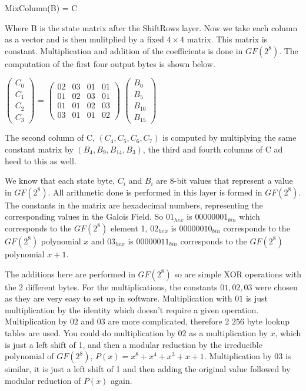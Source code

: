 \begin{center}
MixColumn(B) = C
\end{center}

Where B is the state matrix after the ShiftRows layer. Now we take each column as a vector and is then mulitplied by a fixed $4 \times 4$ matrix. This matrix is constant. Multiplication and addition of the coefficients is done in $GF(2^8)$. The computation of the first four output bytes is shown below.
\begin{center}
$
\begin{pmatrix}
C_0 \\
C_1 \\
C_2 \\
C_3
\end{pmatrix} 
$
=
$
\begin{pmatrix}
02 & 03 & 01 & 01 \\
01 & 02 & 03 & 01 \\
01 & 01 & 02 & 03 \\
03 & 01 & 01 & 02
\end{pmatrix}
$
$
\begin{pmatrix}
B_0 \\
B_5 \\
B_{10} \\
B_{15} 
\end{pmatrix}
$
\end{center}

The second column of C, $(C_4, C_5, C_6, C_7)$ is computed by multiplying the same constant matrix by $(B_4, B_9, B_{14}, B_3)$, the third and fourth columns of C ad heed to this as well. 

We know that each state byte, $C_i$ and $B_i$ are 8-bit values that represent a value in $GF(2^8)$. All arithmetic done is performed in this layer is formed in $GF(2^8)$. The constants in the matrix are hexadecimal numbers, representing the corresponding values in the Galois Field. So $01_{hex}$ is $00000001_{bin}$ which corresponds to the $GF(2^8)$ element 1, $02_{hex}$ is $00000010_{bin}$ corresponds to the $GF(2^8)$ polynomial $x$ and $03_{hex}$ is $00000011_{bin}$ corresponds to the $GF(2^8)$ polynomial $x+1$. 

The additions here are performed in $GF(2^8)$ so are simple XOR operations with the 2 different bytes. For the multiplications, the constants $01,02,03$ were chosen as they are very easy to set up in software. Multiplication with $01$ is just multiplication by the identity which doesn't require a given operation. Multiplication by $02$ and $03$ are more complicated, therefore 2 $256$ byte lookup tables are used. You could do multiplication by $02$ as a multiplication by $x$, which is just a left shift of 1, and then a modular reduction by the irreducible polynomial of $GF(2^8)$, $P(x) = x^8 + x^4 + x^3 + x + 1$. Multiplication by $03$ is similar, it is just a left shift of 1 and then adding the original value followed by modular reduction of $P(x)$ again.

